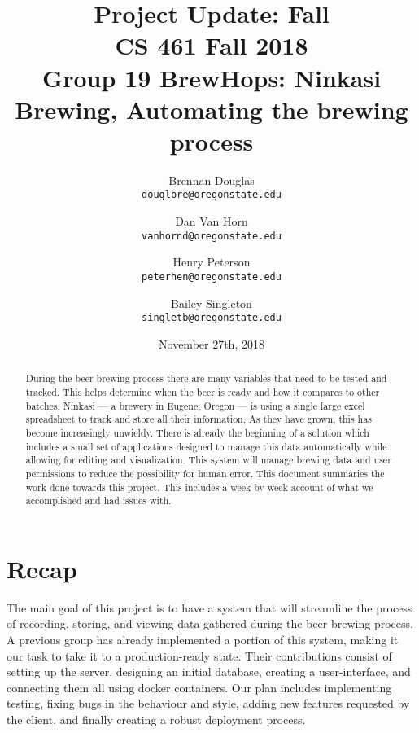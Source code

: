 \documentclass[draftclsnofoot,onecolumn,journal,letterpaper,compsoc,10pt]{IEEEtran}
\begin{document}
\title{Project Update: Fall\\\large CS 461 Fall 2018\\Group 19 BrewHops: Ninkasi Brewing, Automating the brewing process}
\author{
    Brennan Douglas \\
    \texttt{douglbre@oregonstate.edu} \\
    \and
    Dan Van Horn \\
    \texttt{vanhornd@oregonstate.edu} \\
    \and
    Henry Peterson \\
    \texttt{peterhen@oregonstate.edu} \\
    \and
    Bailey Singleton \\
    \texttt{singletb@oregonstate.edu} \\
}
\date{November 27th, 2018}

\begin{titlingpage}
    \maketitle
    \begin{abstract}
    	During the beer brewing process there are many variables that need to be tested and tracked. This helps determine when the beer is ready and how it compares to other batches. Ninkasi --- a brewery in Eugene, Oregon --- is using a single large excel spreadsheet to track and store all their information. As they have grown, this has become increasingly unwieldy. There is already the beginning of a solution which includes a small set of applications designed to manage this data automatically while allowing for editing and visualization. This system will manage brewing data and user permissions to reduce the possibility for human error.  This document summaries the work done towards this project.  This includes a week by week account of what we accomplished and had issues with.
    \end{abstract}
    \pagebreak
    \tableofcontents
\end{titlingpage}

\section{Recap}
The main goal of this project is to have a system that will streamline the process of recording, storing, and viewing data gathered during the beer brewing process. A previous group has already implemented a portion of this system, making it our task to take it to a production-ready state. Their contributions consist of setting up the server, designing an initial database, creating a user-interface, and connecting them all using docker containers. Our plan includes implementing testing, fixing bugs in the behaviour and style, adding new features requested by the client, and finally creating a robust deployment process.
\end{document}
